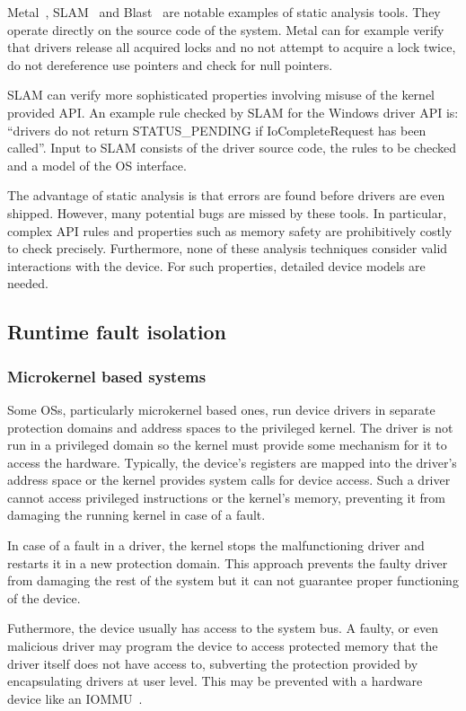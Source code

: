 Metal~\cite{Engler_CCH_00}, SLAM~\cite{Ball_CLR_04} and Blast~\cite{Beyer_HJM_07} are notable examples of static analysis tools. They operate directly on the source code of the system. Metal can for example verify that drivers release all acquired locks and no not attempt to acquire a lock twice, do not dereference use pointers and check for null pointers. 

SLAM can verify more sophisticated properties involving misuse of the kernel provided API. An example rule checked by SLAM for the Windows driver API is: ``drivers do not return STATUS\_PENDING if IoCompleteRequest has been called''. Input to SLAM consists of the driver source code, the rules to be checked and a model of the OS interface.

The advantage of static analysis is that errors are found before drivers are even shipped. However, many potential bugs are missed by these tools. In particular, complex API rules and properties such as memory safety are prohibitively costly to check precisely.  Furthermore, none of these analysis techniques consider valid interactions with the device. For such properties, detailed device models are needed. 

\subsection{Runtime fault isolation}
\subsubsection{Microkernel based systems}

Some OSs, particularly microkernel based ones, run device drivers in separate protection domains and address spaces to the privileged kernel. The driver is not run in a privileged domain so the kernel must provide some mechanism for it to access the hardware. Typically, the device's registers are mapped into the driver's address space or the kernel provides system calls for device access. Such a driver cannot access privileged instructions or the kernel's memory, preventing it from damaging the running kernel in case of a fault. 

In case of a fault in a driver, the kernel stops the malfunctioning driver and restarts it in a new protection domain. This approach prevents the faulty driver from damaging the rest of the system but it can not guarantee proper functioning of the device. 

Futhermore, the device usually has access to the system bus. A faulty, or even malicious driver may program the device to access protected memory that the driver itself does not have access to, subverting the protection provided by encapsulating drivers at user level. This may be prevented with a hardware device like an IOMMU~\cite{BenYehuda_MKXVMN_06}.


